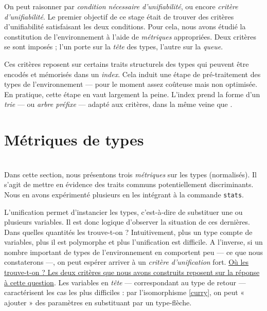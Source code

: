 \documentclass[a4paper]{report}
\theoremstyle{definition}
\newcommand\gab[1]{{\bf\color{Orange}{TODO: #1}}\\}
\newcommand\reformule[1]{\underline{#1}}
\begin{document}
On peut raisonner par \emph{condition nécessaire d'unifiabilité}, ou encore \emph{critère d'unifiabilité}. Le premier objectif de ce stage était de trouver des critères d'unifiabilité satisfaisant les deux conditions. Pour cela, nous avons étudié la constitution de l'environnement à l'aide de \emph{métriques} appropriées. Deux critères se sont imposés ; l'un porte sur la \emph{tête} des types, l'autre sur la \emph{queue}.

Ces critères reposent sur certains traits structurels des types qui peuvent être encodés et mémorisés dans un \emph{index}. Cela induit une étape de pré-traitement des types de l'environnement — pour le moment assez coûteuse mais non optimisée. En pratique, cette étape en vaut largement la peine. L'index prend la forme d'un \emph{trie} — ou \emph{arbre préfixe} — adapté aux critères, dans la même veine que \cite{Schulz}.


\section{Métriques de types}

\gab{Globalement, le message est plutot bon, je pense que tu pourrais le rendre plus direct/claire: \og On veut trouver nos critères nécessaire pour éviter des unif. Pour pouvoir bien faire ca, il faut voir dans quel cas il y a plein d'unifs\fg (c'est globalement ce que tu dis, mais avec plus de détours).}

Dans cette section, nous présentons trois \emph{métriques} sur les types (normalisés). Il s'agit de mettre en évidence des traits communs potentiellement discriminants. Nous en avons expérimenté plusieurs en les intégrant à la commande \texttt{stats}.

L'unification permet d'instancier les types, c'est-à-dire de substituer une ou plusieurs variables. Il est donc logique d'observer la situation de ces dernières. Dans quelles quantités les trouve-t-on ? Intuitivement, plus un type compte de variables, plus il est polymorphe et plus l'unification est difficile. A l'inverse, si un nombre important de types de l'environnement en comportent peu — ce que nous constaterons —, on peut espérer arriver à un \emph{critère d'unification} fort. \reformule{Où les trouve-t-on ? Les deux critères que nous avons construits reposent sur la réponse à cette question}. Les variables en \emph{tête} — correspondant au type de retour — caractérisent les cas les plus difficiles : par l'isomorphisme \eqref{curry}, on peut « ajouter » des paramètres en substituant par un type-flèche.
\gab{la dernière phrase n'est pas claire}
\end{document}
